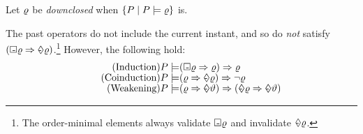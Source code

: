   Let $\varrho$ be \emph{downclosed} when
  $\{ P \mid P \models \varrho \}$ is.


  The past operators do not include the current instant, and so
  do \emph{not} satisfy
  $(\Box\mkern-8.8mu\text{-}\mkern3mu\varrho\Rightarrow\Diamond\mkern-10.1mu\text{-}\mkern4mu\varrho)$.\footnote{The order-minimal elements always validate
    $\Box\mkern-8.8mu\text{-}\mkern3mu\varrho$ and invalidate
    $\Diamond\mkern-10.1mu\text{-}\mkern4mu\varrho$.}
  However, the following hold:
\begin{align*}
  \tag{Induction}
  \aPS \models& (\always\afo \Rightarrow\afo) \Rightarrow\afo
  \\[-1ex]
  \tag{Coinduction}
  \aPS \models& (\afo \Rightarrow\once{\afo}) \Rightarrow\lnot \afo
  \\[-1ex]
  \tag{Weakening}
  \aPS \models& (\afo \Rightarrow\once{\bfo}) \Rightarrow (\once\afo \Rightarrow\once{\bfo})
\end{align*}

